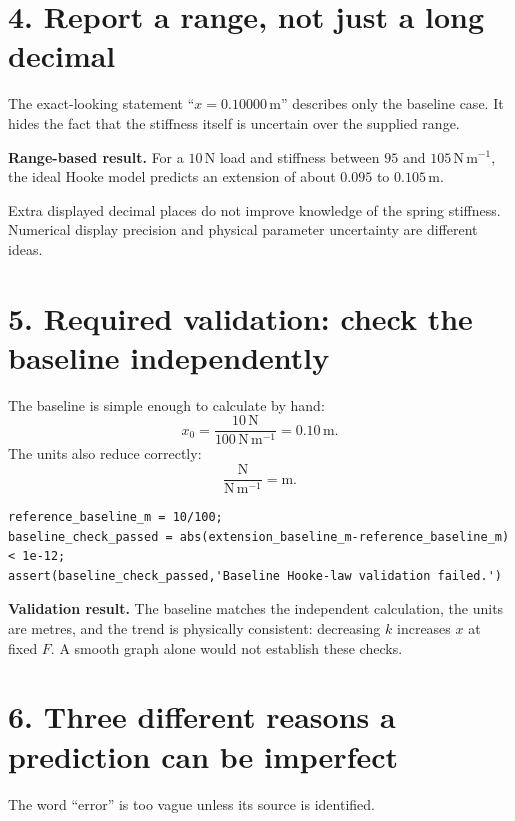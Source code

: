 \documentclass[11pt,a4paper]{article}
\newcommand{\units}[1]{\,\mathrm{#1}}
\begin{document}
\section*{4. Report a range, not just a long decimal}
The exact-looking statement ``$x=0.10000\units{m}$'' describes only the baseline case. It hides the fact that the stiffness itself is uncertain over the supplied range.

\begin{keybox}\textbf{Range-based result.} For a $10\units{N}$ load and stiffness between $95$ and $105\units{N\,m^{-1}}$, the ideal Hooke model predicts an extension of about $0.095$ to $0.105\units{m}$.\end{keybox}

Extra displayed decimal places do not improve knowledge of the spring stiffness. Numerical display precision and physical parameter uncertainty are different ideas.

\section*{5. Required validation: check the baseline independently}
The baseline is simple enough to calculate by hand:
\[
x_0=\frac{10\units{N}}{100\units{N\,m^{-1}}}=0.10\units{m}.
\]
The units also reduce correctly:
\[
\frac{\mathrm{N}}{\mathrm{N\,m^{-1}}}=\mathrm{m}.
\]

\begin{lstlisting}[style=matlabstyle,caption={Independent MATLAB check of the baseline Hooke-law extension.},label={lst:baseline-validation}]
reference_baseline_m = 10/100;
baseline_check_passed = abs(extension_baseline_m-reference_baseline_m) < 1e-12;
assert(baseline_check_passed,'Baseline Hooke-law validation failed.')
\end{lstlisting}

\begin{checkbox}\textbf{Validation result.} The baseline matches the independent calculation, the units are metres, and the trend is physically consistent: decreasing $k$ increases $x$ at fixed $F$. A smooth graph alone would not establish these checks.\end{checkbox}

\section*{6. Three different reasons a prediction can be imperfect}
The word ``error'' is too vague unless its source is identified.
\end{document}
